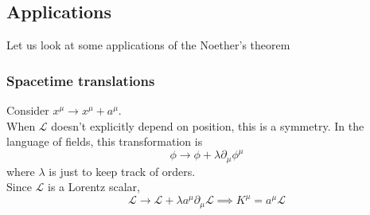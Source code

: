 \documentclass[11pt, notitlepage]{report}
\newcommand{\del}{\partial}
\newcommand{\ld}{\mathcal{L}}
\numberwithin{equation}{section}
\begin{document}
    

    \subsection{Applications}
    Let us look at some applications of the Noether's theorem
    \subsubsection{Spacetime translations}
    Consider \(x^\mu \to x^\mu + a^\mu\).\\
    When \(\ld\) doesn't explicitly depend on position, this is a symmetry. In the language of fields, this transformation is 
    \begin{equation*}
        \phi \to \phi + \lambda \del_\mu \phi^\mu 
    \end{equation*}
    where \(\lambda\) is just to keep track of orders.\\

    Since \(\ld\) is a Lorentz scalar, 
    \begin{equation*}
        \ld \to \ld + \lambda a^\mu \del_\mu \ld \implies K^\mu =  a^\mu \ld
    \end{equation*}
\end{document}
